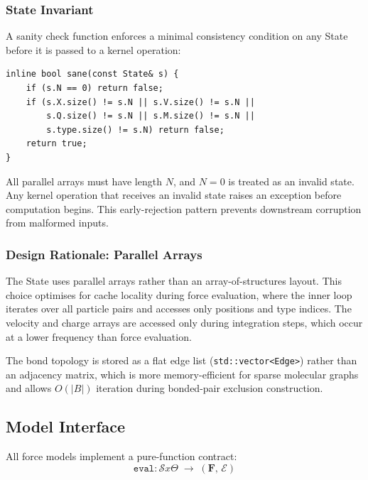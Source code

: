 \documentclass[11pt,twoside]{article}
\def\times{x}%
\newcommand{\type}[1]{\texttt{#1}}
\begin{document}
\subsubsection{State Invariant}

A sanity check function enforces a minimal consistency condition on any State before it is passed to a kernel operation:

\begin{lstlisting}
inline bool sane(const State& s) {
    if (s.N == 0) return false;
    if (s.X.size() != s.N || s.V.size() != s.N ||
        s.Q.size() != s.N || s.M.size() != s.N ||
        s.type.size() != s.N) return false;
    return true;
}
\end{lstlisting}

All parallel arrays must have length $N$, and $N = 0$ is treated as an invalid state. Any kernel operation that receives an invalid state raises an exception before computation begins. This early-rejection pattern prevents downstream corruption from malformed inputs.

\subsubsection{Design Rationale: Parallel Arrays}

The State uses parallel arrays rather than an array-of-structures layout. This choice optimises for cache locality during force evaluation, where the inner loop iterates over all particle pairs and accesses only positions and type indices. The velocity and charge arrays are accessed only during integration steps, which occur at a lower frequency than force evaluation.

The bond topology is stored as a flat edge list (\type{std::vector<Edge>}) rather than an adjacency matrix, which is more memory-efficient for sparse molecular graphs and allows $O(|B|)$ iteration during bonded-pair exclusion construction.

\subsection{Model Interface}
\label{sec:model-interface}

All force models implement a pure-function contract:
\begin{equation}
  \texttt{eval} : \mathcal{S} \times \Theta \;\longrightarrow\; (\mathbf{F},\, \mathcal{E})
  \label{eq:eval-contract}
\end{equation}
\end{document}
